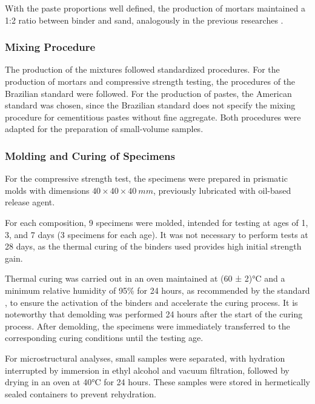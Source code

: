 With the paste proportions well defined, the production of mortars maintained a 1:2 ratio between binder and sand, analogously in the previous researches \cite{batista2025mgosio2}. 

\subsubsection{Mixing Procedure}
\label{sec:mixing_procedure}

The production of the mixtures followed standardized procedures. For the production of mortars and compressive strength testing, the procedures of the Brazilian standard \cite{ABNT_NBR_7215_2019} were followed. For the production of pastes, the American standard \cite{ASTM_C305_2006} was chosen, since the Brazilian standard does not specify the mixing procedure for cementitious pastes without fine aggregate. Both procedures were adapted for the preparation of small-volume samples.

\subsubsection{Molding and Curing of Specimens}
\label{sec:molding_and_curing_specimens}

For the compressive strength test, the specimens were prepared in prismatic molds with dimensions $40 \times 40 \times 40 \ mm$, previously lubricated with oil-based release agent.

For each composition, 9 specimens were molded, intended for testing at ages of 1, 3, and 7 days (3 specimens for each age). It was not necessary to perform tests at 28 days, as the thermal curing of the binders used provides high initial strength gain.

Thermal curing was carried out in an oven maintained at (60 ± 2)°C and a minimum relative humidity of 95\% for 24 hours, as recommended by the standard \cite{ABNT_NBR_9479_2006}, to ensure the activation of the binders and accelerate the curing process.
It is noteworthy that demolding was performed 24 hours after the start of the curing process. After demolding, the specimens were immediately transferred to the corresponding curing conditions until the testing age.

For microstructural analyses, small samples were separated, with hydration interrupted by immersion in ethyl alcohol and vacuum filtration, followed by drying in an oven at 40°C for 24 hours.
These samples were stored in hermetically sealed containers to prevent rehydration.

